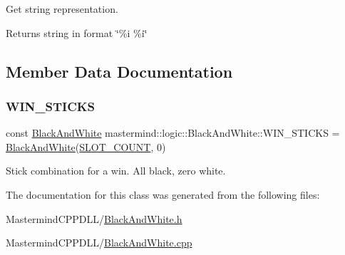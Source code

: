 Get string representation. 

\begin{DoxyReturn}{Returns}
string in format \char`\"{}\%i \%i\char`\"{} 
\end{DoxyReturn}


\subsection{Member Data Documentation}
\hypertarget{classmastermind_1_1logic_1_1_black_and_white_a9c0ca1063cd6e8d41b0d87d510de33f5}{}\label{classmastermind_1_1logic_1_1_black_and_white_a9c0ca1063cd6e8d41b0d87d510de33f5} 
\subsubsection{\texorpdfstring{W\+I\+N\+\_\+\+S\+T\+I\+C\+KS}{WIN\_STICKS}}
{\footnotesize\ttfamily const \hyperlink{classmastermind_1_1logic_1_1_black_and_white}{Black\+And\+White} mastermind\+::logic\+::\+Black\+And\+White\+::\+W\+I\+N\+\_\+\+S\+T\+I\+C\+KS = \hyperlink{classmastermind_1_1logic_1_1_black_and_white}{Black\+And\+White}(\hyperlink{classmastermind_1_1_mastermind_ad4cfc8127641ff8dfe89d65ae232331c}{S\+L\+O\+T\+\_\+\+C\+O\+U\+NT}, 0)\hspace{0.3cm}{\ttfamily [static]}}



Stick combination for a win. All black, zero white. 



The documentation for this class was generated from the following files\+:\begin{DoxyCompactItemize}
\item 
Mastermind\+C\+P\+P\+D\+L\+L/\hyperlink{_black_and_white_8h}{Black\+And\+White.\+h}\item 
Mastermind\+C\+P\+P\+D\+L\+L/\hyperlink{_black_and_white_8cpp}{Black\+And\+White.\+cpp}\end{DoxyCompactItemize}
